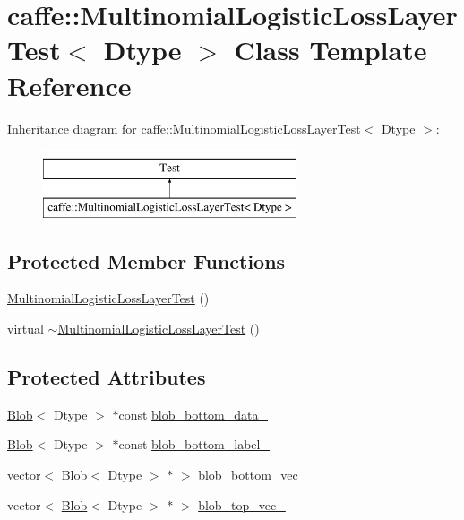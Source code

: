\hypertarget{classcaffe_1_1_multinomial_logistic_loss_layer_test}{\section{caffe\+:\+:Multinomial\+Logistic\+Loss\+Layer\+Test$<$ Dtype $>$ Class Template Reference}
\label{classcaffe_1_1_multinomial_logistic_loss_layer_test}
}
Inheritance diagram for caffe\+:\+:Multinomial\+Logistic\+Loss\+Layer\+Test$<$ Dtype $>$\+:\begin{figure}[H]
\begin{center}
\leavevmode
\includegraphics[height=2.000000cm]{classcaffe_1_1_multinomial_logistic_loss_layer_test}
\end{center}
\end{figure}
\subsection*{Protected Member Functions}
\begin{DoxyCompactItemize}
\item 
\hyperlink{classcaffe_1_1_multinomial_logistic_loss_layer_test_a098d2b1a8732f778882526813d55e658}{Multinomial\+Logistic\+Loss\+Layer\+Test} ()
\item 
virtual \hyperlink{classcaffe_1_1_multinomial_logistic_loss_layer_test_ab8c2c439b175da09d87e5bfcf4f87779}{$\sim$\+Multinomial\+Logistic\+Loss\+Layer\+Test} ()
\end{DoxyCompactItemize}
\subsection*{Protected Attributes}
\begin{DoxyCompactItemize}
\item 
\hyperlink{classcaffe_1_1_blob}{Blob}$<$ Dtype $>$ $\ast$const \hyperlink{classcaffe_1_1_multinomial_logistic_loss_layer_test_a3ff6abb2618f4ea1257e3f423e2d1bef}{blob\+\_\+bottom\+\_\+data\+\_\+}
\item 
\hyperlink{classcaffe_1_1_blob}{Blob}$<$ Dtype $>$ $\ast$const \hyperlink{classcaffe_1_1_multinomial_logistic_loss_layer_test_a8d187356bce9457509a461e4aad1ea0b}{blob\+\_\+bottom\+\_\+label\+\_\+}
\item 
vector$<$ \hyperlink{classcaffe_1_1_blob}{Blob}$<$ Dtype $>$ $\ast$ $>$ \hyperlink{classcaffe_1_1_multinomial_logistic_loss_layer_test_a1e54a2b39c6607f7addf35509af7ff1f}{blob\+\_\+bottom\+\_\+vec\+\_\+}
\item 
vector$<$ \hyperlink{classcaffe_1_1_blob}{Blob}$<$ Dtype $>$ $\ast$ $>$ \hyperlink{classcaffe_1_1_multinomial_logistic_loss_layer_test_a4783a4aa643582e0d8ee36eb9fc44889}{blob\+\_\+top\+\_\+vec\+\_\+}
\end{DoxyCompactItemize}


